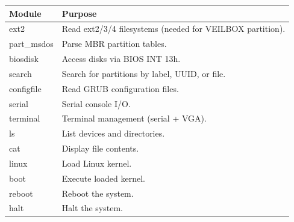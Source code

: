 \begin{longtable}{|p{4cm}|p{8cm}|}
\hline
\textbf{Module} & \textbf{Purpose} \\
\hline
ext2 & Read ext2/3/4 filesystems (needed for VEILBOX partition). \\
part\_msdos & Parse MBR partition tables. \\
biosdisk & Access disks via BIOS INT 13h. \\
search & Search for partitions by label, UUID, or file. \\
configfile & Read GRUB configuration files. \\
serial & Serial console I/O. \\
terminal & Terminal management (serial + VGA). \\
ls & List devices and directories. \\
cat & Display file contents. \\
linux & Load Linux kernel. \\
boot & Execute loaded kernel. \\
reboot & Reboot the system. \\
halt & Halt the system. \\
\hline
\end{longtable}
